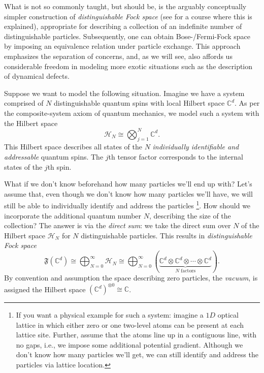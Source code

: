 \documentclass[aps,prx,twocolumn,superscriptaddress,noshowkeys]{revtex4-2}  %
\theoremstyle{plain}%
\theoremstyle{definition}
\theoremstyle{remark}
\begin{document}
What is not so commonly taught, but should be, is the arguably conceptually simpler construction of \emph{distinguishable Fock space} (see \cite{OsborneVideoLectureAQT} for a course where this is explained), appropriate for describing a collection of an indefinite number of distinguishable particles. Subsequently, one can obtain Bose-/Fermi-Fock space by imposing an equivalence relation under particle exchange. This approach emphasizes the separation of concerns, and, as we will see, also affords us considerable freedom in modeling more exotic situations such as the description of dynamical defects.

Suppose we want to model the following situation. Imagine we have a system comprised of $N$ distinguishable quantum spins with local Hilbert space $\mathbb{C}^d$. As per the composite-system axiom of quantum mechanics, we model such a system with the Hilbert space
\begin{equation}
\mathcal{H}_N \cong \bigotimes_{j=1}^N \mathbb{C}^d.
\end{equation}
This Hilbert space describes all states of the $N$ \emph{individually identifiable and addressable} quantum spins. The $j$th tensor factor corresponds to the internal states of the $j$th spin.

What if we don't know beforehand how many particles we'll end up with? Let's assume that, even though we don't know how many particles we'll have, we will still be able to individually identify and address the particles \footnote{If you want a physical example for such a system: imagine a $1D$ optical lattice in which either zero or one two-level atoms can be present at each lattice site. Further, assume that the atoms line up in a contiguous line, with no gaps, i.e., we impose some additional potential gradient. Although we don't know how many particles we'll get, we can still identify and address the particles via lattice location.}. How should we incorporate the additional quantum number $N$, describing the size of the collection? The answer is via the \emph{direct sum}: we take the direct sum over $N$ of the Hilbert space $\mathcal{H}_N$ for $N$ distinguishable particles. This results in \emph{distinguishable Fock space}
\begin{equation}
\mathfrak{F}(\mathbb{C}^d) \cong \bigoplus_{N=0}^\infty \mathcal{H}_N\cong \bigoplus_{N=0}^\infty (\underbrace{\mathbb{C}^d\otimes \mathbb{C}^d\otimes \cdots \otimes \mathbb{C}^d}_{\text{$N$ factors}}).
\end{equation}
By convention and assumption the space describing zero particles, the \emph{vacuum}, is assigned the Hilbert space $(\mathbb{C}^d)^{\otimes 0} \cong \mathbb{C}$.
\end{document}
